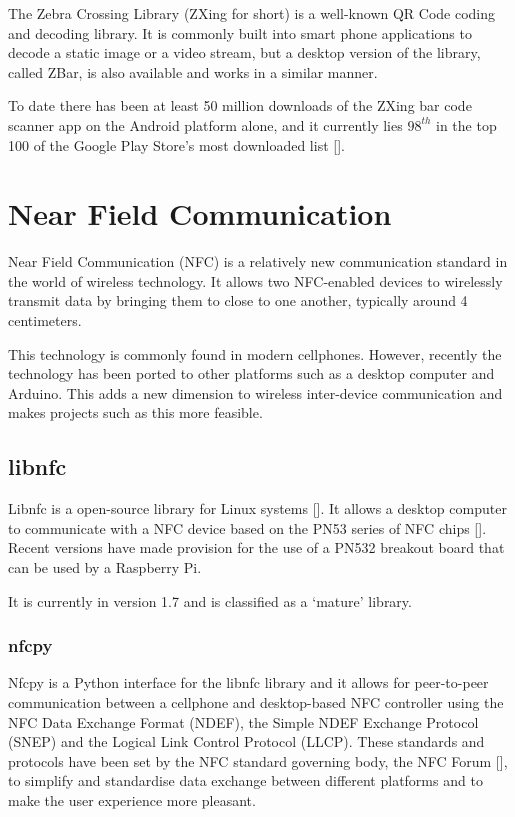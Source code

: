 The Zebra Crossing Library (ZXing for short) is a well-known QR Code coding and decoding
library.
It is commonly built into smart phone applications to decode a static image or a video stream,
but a desktop version of the library, called ZBar, is also available and works in a similar
manner. 

To date there has been at least 50 million downloads of the ZXing
bar code scanner app on the Android platform alone, and it currently lies $98^{th}$ in the top
100 of the Google Play Store's most downloaded list [\cite{website:barcodescanner}].

\section{Near Field Communication}

Near Field Communication (NFC) is a relatively new communication standard in the world of
wireless technology. It allows two NFC-enabled devices to wirelessly transmit data by bringing
them to close to one another, typically around 4 centimeters.

This technology is commonly found in modern cellphones. However, recently the technology has
been ported to other platforms such as a desktop computer and Arduino. This adds a new
dimension to wireless inter-device communication and makes projects such as this more
feasible.

\subsection{libnfc}

Libnfc is a open-source library for Linux systems [\cite{website:libnfc}]. It allows a desktop
computer to communicate with a NFC device based on the PN53 series of NFC chips
[\cite{website:libnfc-hardware}]. Recent versions have made provision for the use of a PN532
breakout board that can be used by a Raspberry Pi. 

It is currently in version 1.7 and is classified as a `mature' library. 

\subsubsection{nfcpy}

Nfcpy is a Python interface for the libnfc library and it allows for peer-to-peer communication
between a cellphone and desktop-based NFC controller using the NFC Data Exchange Format
(NDEF), the Simple NDEF Exchange Protocol (SNEP) and the Logical Link Control Protocol (LLCP).
These standards and protocols have been set by the NFC standard governing body, the NFC Forum
[\cite{website:nfc-forum}], to simplify and standardise data exchange between different
platforms and to make the user experience more pleasant.

